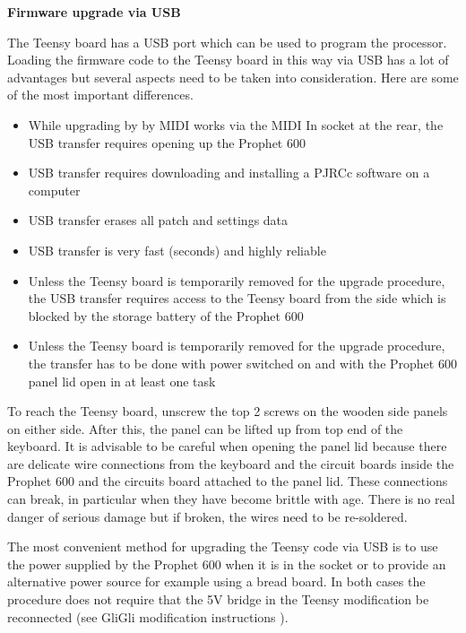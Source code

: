 \textbf{Firmware upgrade via USB}

The Teensy board has a USB port which can be used to program the processor. Loading the firmware code to the Teensy board in this way via USB has a lot of advantages but several aspects need to be taken into consideration. Here are some of the most important differences.

\begin{itemize}
  \item While upgrading by by MIDI works via the MIDI In socket at the rear, the USB transfer requires opening up the Prophet 600
  \item USB transfer requires downloading and installing a PJRCc software on a computer
  \item USB transfer erases all patch and settings data
  \item USB transfer is very fast (seconds) and highly reliable
  \item Unless the Teensy board is temporarily removed for the upgrade procedure, the USB transfer requires access to the Teensy board from the side which is blocked by the storage battery of the Prophet 600
  \item Unless the Teensy board is temporarily removed for the upgrade procedure, the transfer has to be done with power switched on and with the Prophet 600 panel lid open in at least one task 
\end{itemize}

To reach the Teensy board, unscrew the top 2 screws on the wooden side panels on either side. After this, the panel can be lifted up from top end of the keyboard. It is advisable to be careful when opening the panel lid because there are delicate wire connections from the keyboard and the circuit boards inside the Prophet 600 and the circuits board attached to the panel lid. These connections can break, in particular when they have become brittle with age. There is no real danger of serious damage but if broken, the wires need to be re-soldered.


The most convenient method for upgrading the Teensy code via USB is to use the power supplied by the Prophet 600 when it is in the socket or to provide an alternative power source for example using a bread board. In both cases the procedure does not require that the 5V bridge in the Teensy modification be reconnected (see GliGli modification instructions \cite{modinstructions}).

